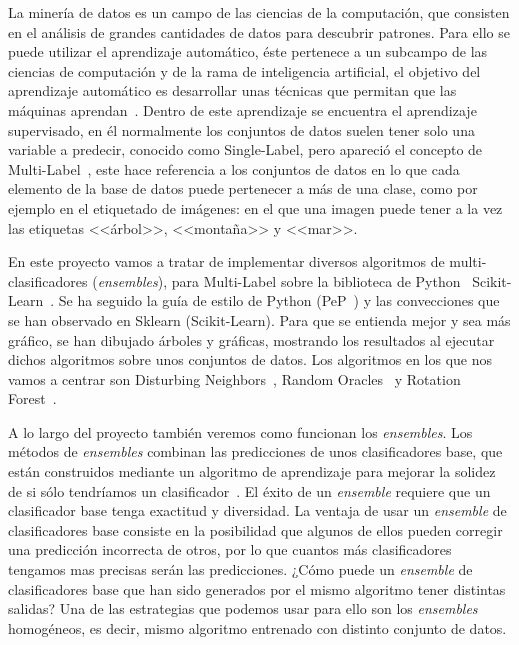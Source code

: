 
La minería de datos es un campo de 	las ciencias de la computación, que consisten en el análisis de grandes cantidades de datos para descubrir patrones.
Para ello se puede utilizar el aprendizaje automático, éste pertenece a un subcampo de las ciencias de computación y de la rama de inteligencia artificial, el objetivo del aprendizaje automático es desarrollar unas técnicas que permitan que las máquinas aprendan~\cite{wiki:datamining}.
Dentro de este aprendizaje se encuentra el aprendizaje supervisado, en él normalmente los conjuntos de datos suelen tener solo una variable a predecir, conocido como Single-Label, pero apareció el concepto de Multi-Label~\cite{multilabel2}, este hace referencia a los conjuntos de datos en lo que cada elemento de la base de datos puede pertenecer a más de una clase, como por ejemplo en el etiquetado de imágenes: en el que una imagen puede tener a la vez las etiquetas <<árbol>>, <<montaña>> y <<mar>>.

En este proyecto vamos a tratar de implementar diversos algoritmos de multi-clasificadores (\textit{ensembles}), para Multi-Label sobre la biblioteca de Python~\cite{python} Scikit-Learn~\cite{scikitlearn}. Se ha seguido la guía de estilo de Python (PeP~\cite{pep}) y las convecciones que se han observado en Sklearn (Scikit-Learn). Para que se entienda mejor y sea más gráfico, se han dibujado árboles y gráficas, mostrando los resultados al ejecutar dichos algoritmos sobre unos conjuntos de datos. Los algoritmos en los que nos vamos a centrar son Disturbing Neighbors~\cite{disturbingneighbors}, Random Oracles~\cite{randomoracles} y Rotation Forest~\cite{rotationforest}.

A lo largo del proyecto también veremos como funcionan los \textit{ensembles}.
Los métodos de \textit{ensembles} combinan las predicciones de unos clasificadores base, que están construidos mediante un algoritmo de aprendizaje para mejorar la solidez de si sólo tendríamos un clasificador~\cite{ensemble}.
El éxito de un \textit{ensemble} requiere que un clasificador base tenga exactitud y diversidad.
La ventaja de usar un \textit{ensemble} de clasificadores base consiste en la posibilidad que algunos de ellos pueden corregir una predicción incorrecta de otros, por lo que cuantos más clasificadores tengamos mas precisas serán las predicciones. 
¿Cómo puede un \textit{ensemble} de clasificadores base que han sido generados por el mismo algoritmo tener distintas salidas? Una de las estrategias que podemos usar para ello son los \textit{ensembles} homogéneos, es decir, mismo algoritmo entrenado con distinto conjunto de datos.
